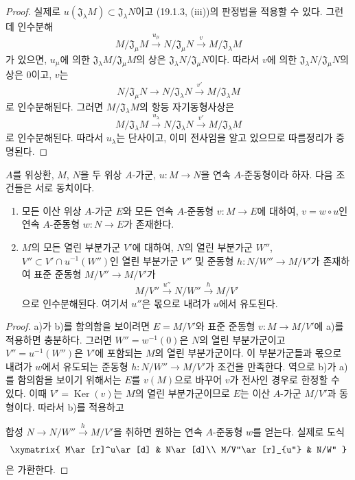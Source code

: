 \begin{proof}
실제로
$u(\mathfrak J_\lambda M)\subset\mathfrak J_\lambda N$이고
(19.1.3, (iii))의 판정법을 적용할 수 있다. 그런데 인수분해
\[
  M/\mathfrak J_\mu M\xrightarrow{u_\mu}
  N/\mathfrak J_\mu N\xrightarrow{v}M/\mathfrak J_\lambda M
\]
가 있으면, $u_\mu$에 의한
$\mathfrak J_\lambda M/\mathfrak J_\mu M$의 상은
$\mathfrak J_\lambda N/\mathfrak J_\mu N$이다. 따라서
$v$에 의한 $\mathfrak J_\lambda N/\mathfrak J_\mu N$의 상은
$0$이고, $v$는
\[
  N/\mathfrak J_\mu N\longrightarrow N/\mathfrak J_\lambda N
  \xrightarrow{v'}M/\mathfrak J_\lambda M
\]
로 인수분해된다. 그러면 $M/\mathfrak J_\lambda M$의 항등
자기동형사상은
\[
  M/\mathfrak J_\lambda M\xrightarrow{u_\lambda}
  N/\mathfrak J_\lambda N\xrightarrow{v'}M/\mathfrak J_\lambda M
\]
로 인수분해된다. 따라서 $u_\lambda$는 단사이고, 이미 전사임을
알고 있으므로 따름정리가 증명된다.
\end{proof}

\begin{proposition}[19.1.5]
\label{0.19.1.5-fr}
$A$를 위상환, $M$, $N$을 두 위상 $A$-가군,
$u:M\to N$을 연속 $A$-준동형이라 하자. 다음 조건들은 서로 동치이다.
\begin{enumerate}
  \item[a)] 모든 이산 위상 $A$-가군 $E$와 모든 연속 $A$-준동형
  $v:M\to E$에 대하여, $v=w\circ u$인 연속 $A$-준동형
  $w:N\to E$가 존재한다.
  \item[b)] $M$의 모든 열린 부분가군 $V'$에 대하여, $N$의 열린
  부분가군 $W''$, $V''\subset V'\cap u^{-1}(W'')$인 열린 부분가군
  $V''$ 및 준동형 $h:N/W''\to M/V'$가 존재하여 표준 준동형
  $M/V''\to M/V'$가
  \[
    M/V''\xrightarrow{u''}N/W''\xrightarrow{h}M/V'
  \]
  으로 인수분해된다. 여기서 $u''$은 몫으로 내려가 $u$에서 유도된다.
\end{enumerate}
\end{proposition}

\begin{proof}
a)가 b)를 함의함을 보이려면 $E=M/V'$와 표준 준동형
$v:M\to M/V'$에 a)를 적용하면 충분하다. 그러면
$W''=w^{-1}(0)$은 $N$의 열린 부분가군이고
$V''=u^{-1}(W'')$은 $V'$에 포함되는 $M$의 열린 부분가군이다.
이 부분가군들과 몫으로 내려가 $w$에서 유도되는 준동형
$h:N/W''\to M/V'$가 조건을 만족한다. 역으로 b)가 a)를 함의함을
보이기 위해서는 $E$를 $v(M)$으로 바꾸어 $v$가 전사인 경우로
한정할 수 있다. 이때 $V'=\operatorname{Ker}(v)$는 $M$의 열린
부분가군이므로 $E$는 이산 $A$-가군 $M/V'$과 동형이다. 따라서
b)를 적용하고


합성 $N\to N/W''\xrightarrow{h}M/V'$을 취하면 원하는 연속
$A$-준동형 $w$를 얻는다. 실제로 도식
\[
  \xymatrix{
    M\ar[r]^u\ar[d] & N\ar[d]\\
    M/V''\ar[r]_{u''} & N/W''
  }
\]
은 가환한다.
\end{proof}

